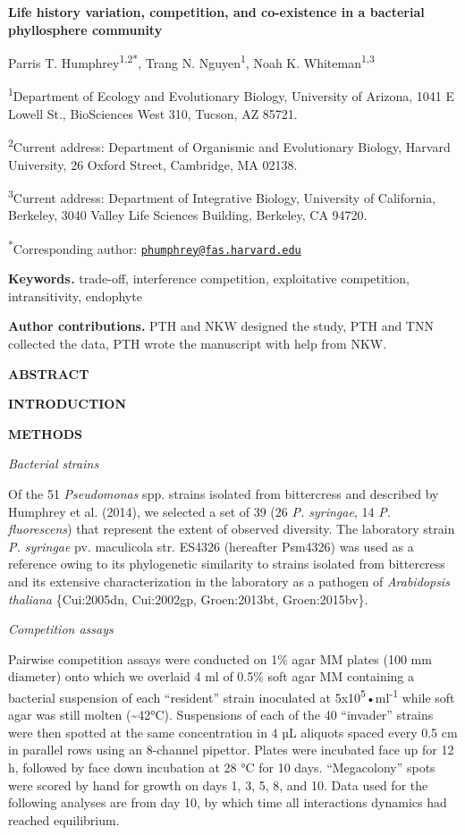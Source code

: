 \textbf{Life history variation, competition, and co-existence in a
bacterial phyllosphere community}

Parris T. Humphrey\textsuperscript{1,2*}, Trang N.
Nguyen\textsuperscript{1}, Noah K. Whiteman\textsuperscript{1,3}

\textsuperscript{1}Department of Ecology and Evolutionary Biology,
University of Arizona, 1041 E Lowell St., BioSciences West 310, Tucson,
AZ 85721.

\textsuperscript{2}Current address: Department of Organismic and
Evolutionary Biology, Harvard University, 26 Oxford Street, Cambridge,
MA 02138.

\textsuperscript{3}Current address: Department of Integrative Biology,
University of California, Berkeley, 3040 Valley Life Sciences Building,
Berkeley, CA 94720.

\textsuperscript{*}Corresponding author:
\href{mailto:phumphrey@fas.harvard.edu}{\nolinkurl{phumphrey@fas.harvard.edu}}

\textbf{Keywords\emph{.}} trade-off, interference competition,
exploitative competition, intransitivity, endophyte

\textbf{Author contributions.} PTH and NKW designed the study, PTH and
TNN collected the data, PTH wrote the manuscript with help from NKW.

\textbf{ABSTRACT}

\textbf{INTRODUCTION}

\textbf{METHODS}

\emph{Bacterial strains}

Of the 51 \emph{Pseudomonas} spp. strains isolated from bittercress and
described by Humphrey et al. (2014), we selected a set of 39 (26
\emph{P. syringae}, 14 \emph{P. fluorescens}) that represent the extent
of observed diversity. The laboratory strain \emph{P. syringae} pv.
maculicola str. ES4326 (hereafter Psm4326) was used as a reference owing
to its phylogenetic similarity to strains isolated from bittercress and
its extensive characterization in the laboratory as a pathogen of
\emph{Arabidopsis thaliana} \{Cui:2005dn, Cui:2002gp, Groen:2013bt,
Groen:2015bv\}.

\emph{Competition assays}

Pairwise competition assays were conducted on 1\% agar MM plates (100 mm
diameter) onto which we overlaid 4 ml of 0.5\% soft agar MM containing a
bacterial suspension of each ``resident'' strain inoculated at
5x10\textsuperscript{5}•ml\textsuperscript{-1} while soft agar was still
molten (\textasciitilde{}42°C). Suspensions of each of the 40
``invader'' strains were then spotted at the same concentration in 4 µL
aliquots spaced every 0.5 cm in parallel rows using an 8-channel
pipettor. Plates were incubated face up for 12 h, followed by face down
incubation at 28 °C for 10 days. ``Megacolony'' spots were scored by
hand for growth on days 1, 3, 5, 8, and 10. Data used for the following
analyses are from day 10, by which time all interactions dynamics had
reached equilibrium.

